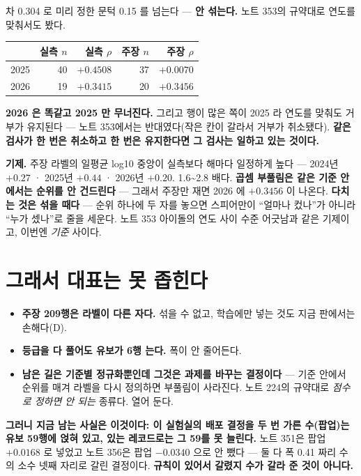 \documentclass[11pt]{article}
\begin{document}
차 0.304 로 미리 정한 문턱 0.15 를 넘는다 --- \textbf{안 섞는다.}
노트 353의 규약대로 연도를 맞춰서도 봤다.

\begin{center}
\begin{tabular}{lrrrr}
\hline
 & 실측 $n$ & 실측 $\rho$ & 주장 $n$ & 주장 $\rho$ \\
\hline
2025 & 40 & $+0.4508$ & 37 & $\mathbf{+0.0070}$ \\
2026 & 19 & $+0.3415$ & 20 & $+0.3456$ \\
\hline
\end{tabular}
\end{center}

\textbf{2026 은 똑같고 2025 만 무너진다.} 그리고 행이 많은 쪽이 2025 라
연도를 맞춰도 거부가 유지된다 --- 노트 353에서는 반대였다(작은 칸이
갈라서 거부가 취소됐다). \textbf{같은 검사가 한 번은 취소하고 한 번은
유지한다면 그 검사는 일하고 있는 것이다.}

\textbf{기제.} 주장 라벨의 일평균 log10 중앙이 실측보다 해마다 일정하게
높다 --- 2024년 $+0.27$ · 2025년 $+0.44$ · 2026년 $+0.20$. 1.6\textasciitilde{}2.8
배다. \textbf{곱셈 부풀림은 같은 기준 안에서는 순위를 안 건드린다} ---
그래서 주장만 재면 2026 에 $+0.3456$ 이 나온다. \textbf{다치는 것은
섞을 때다} --- 순위 하나에 두 자를 놓으면 스피어만이 ``얼마나 컸나''가
아니라 ``누가 셌나''로 줄을 세운다. 노트 353 아이돌의 연도 사이 수준
어긋남과 같은 기제이고, 이번엔 \emph{기준} 사이다.

\section{그래서 대표는 못 좁힌다}

\begin{itemize}
\item \textbf{주장 209행은 라벨이 다른 자다.} 섞을 수 없고, 학습에만 넣는
것도 지금 판에서는 손해다(D).
\item \textbf{등급을 다 풀어도 유보가 6행 는다.} 폭이 안 줄어든다.
\item \textbf{남은 길은 기준별 정규화뿐인데 그것은 과제를 바꾸는 결정이다}
--- 기준 안에서 순위를 매겨 라벨을 다시 정의하면 부풀림이 사라진다. 노트
224의 규약대로 \emph{점수로 정하면 안 되는} 종류다. 열어 둔다.
\end{itemize}

\textbf{그러니 지금 남는 사실은 이것이다: 이 실험실의 배포 결정을 두 번
가른 수(팝업)는 유보 59행에 얹혀 있고, 있는 레코드로는 그 59를 못 늘린다.}
노트 351은 팝업 $+0.0168$ 로 넣었고 노트 356은 팝업 $-0.0340$ 으로 안
뺐다 --- 둘 다 폭 0.41 짜리 수의 소수 넷째 자리로 갈린 결정이다.
\textbf{규칙이 있어서 갈렸지 수가 갈라 준 것이 아니다.}
\end{document}
